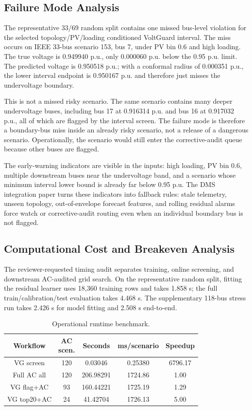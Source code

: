 \documentclass[
  preprint,12pt]{elsarticle}
\begin{document}
\subsection{Failure Mode Analysis}\label{failure-mode-analysis}

The representative 33/69 random split contains one missed bus-level
violation for the selected topology/PV/loading conditioned VoltGuard
interval. The miss occurs on IEEE 33-bus scenario 153, bus 7, under PV
bin 0.6 and high loading. The true voltage is 0.949940 p.u., only
0.000060 p.u. below the 0.95 p.u. limit. The predicted voltage is
0.950518 p.u.; with a conformal radius of 0.000351 p.u., the lower
interval endpoint is 0.950167 p.u. and therefore just misses the
undervoltage boundary.

This is not a missed risky scenario. The same scenario contains many
deeper undervoltage buses, including bus 17 at 0.916314 p.u. and bus 16
at 0.917032 p.u., all of which are flagged by the interval screen. The
failure mode is therefore a boundary-bus miss inside an already risky
scenario, not a release of a dangerous scenario. Operationally, the
scenario would still enter the corrective-audit queue because other
buses are flagged.

The early-warning indicators are visible in the inputs: high loading, PV
bin 0.6, multiple downstream buses near the undervoltage band, and a
scenario whose minimum interval lower bound is already far below 0.95
p.u. The DMS integration paper turns these indicators into fallback
rules: stale telemetry, unseen topology, out-of-envelope forecast
features, and rolling residual alarms force watch or corrective-audit
routing even when an individual boundary bus is not flagged.

\subsection{Computational Cost and Breakeven
Analysis}\label{computational-cost-and-breakeven-analysis}

The reviewer-requested timing audit separates training, online
screening, and downstream AC-audited grid search. On the representative
random split, fitting the residual learner uses 18,360 training rows and
takes 1.858 s; the full train/calibration/test evaluation takes 4.468 s.
The supplementary 118-bus stress run takes 2.426 s for model fitting and
2.508 s end-to-end.

\begin{longtable}[]{@{}ccccc@{}}
\caption{Operational runtime benchmark.}\\\toprule\noalign{}
Workflow & \shortstack{AC\\scen.} & Seconds & ms/scenario & Speedup \\
\midrule\noalign{}
\endhead
\bottomrule\noalign{}
\endlastfoot
VG screen & 120 & 0.03046 & 0.25380 & 6796.17 \\
Full AC all & 120 & 206.98291 & 1724.86 & 1.00 \\
VG flag+AC & 93 & 160.44221 & 1725.19 & 1.29 \\
VG top20+AC & 24 & 41.42704 & 1726.13 & 5.00 \\
\end{longtable}
\end{document}
